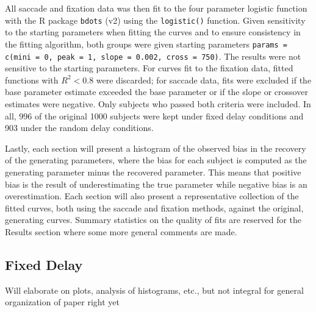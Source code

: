 \documentclass{article}
\newcommand{\xt}{\texttt}%
\begin{document}
All saccade and fixation data was then fit to the four parameter logistic function with the R package \xt{bdots} (v2) using the \xt{logistic()} function. Given sensitivity to the starting parameters when fitting the curves and to ensure consistency in the fitting algorithm, both groups were given starting parameters \xt{params = c(mini = 0, peak = 1, slope = 0.002,  cross = 750)}. The results were not sensitive to the starting parameters. For curves fit to the fixation data, fitted functions with $R^2 < 0.8$ were discarded; for saccade data, fits were excluded if the base parameter estimate exceeded the base parameter or if the slope or crossover estimates were negative. Only subjects who passed both criteria were included. In all, 996 of the original 1000 subjects were kept under fixed delay conditions and 903 under the random delay conditions.

Lastly, each section will present a histogram of the observed bias in the recovery of the generating parameters, where the bias for each subject is computed as the generating parameter minus the recovered parameter. This means that positive bias is the result of underestimating the true parameter while negative bias is an overestimation. Each section will also present a representative collection of the fitted curves, both using the saccade and fixation methods, against the original, generating curves. Summary statistics on the quality of fits are reserved for the Results section where some more general comments are made. 


\subsection{Fixed Delay}

Will elaborate on plots, analysis of histograms, etc., but not integral for general organization of paper right yet


\end{document}
